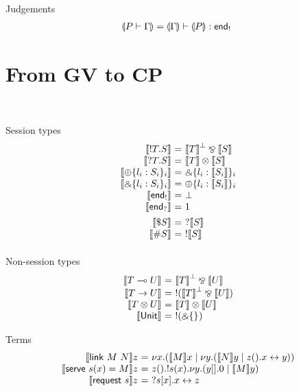\documentclass{easychair}
\makeatletter
\newcommand{\ba}{\begin{array}}
\newcommand{\ea}{\end{array}}
\newenvironment{equations}{\[\ba{@{}r@{~}c@{~}l@{}}}{\ea\]}
\newcommand{\key}{\mathsf}
\newcommand{\set}[1]{\{ #1 \}}
\newcommand{\gvtocp}[1]{\llbracket{#1}\rrbracket}
\newcommand{\cptogv}[1]{\llparenthesis{#1}\rrparenthesis}
\newcommand{\row}[2]{\set{#1}_{#2}}
\newcommand{\gvOutput}[2]{!{#1}.{#2}}
\newcommand{\gvInput}[2]{?{#1}.{#2}}
\newcommand{\gvEndOutput}{\key{end}_!}
\newcommand{\gvEndInput}{\key{end}_?}
\newcommand{\gvPlus}[2]{\oplus \row{#1}{#2}}
\newcommand{\gvChoice}[2]{\binampersand \row{#1}{#2}}
\newcommand{\gvServer}[1]{\${#1}}
\newcommand{\gvService}[1]{\#{#1}}
\newcommand{\cpj}[2]{{#1} \vdash {#2}}
\newcommand{\gvj}[3]{{#1} \vdash {#2} : {#3}}
\newcommand{\la}{l}
\newcommand{\PR}{P}
\newcommand{\G}{\Gamma}
\newcommand{\SE}{S}
\newcommand{\T}{T}
\newcommand{\U}{U}
\newcommand{\gvLinFun}[2]{{#1} \multimap {#2}}
\newcommand{\gvUnFun}[2]{{#1} \to {#2}}
\newcommand{\gvTimes}[2]{{#1} \otimes {#2}}
\newcommand{\gvUnitType}{\key{Unit}}
\newcommand{\gvLink}[2]{\key{link}~{#1}~{#2}}
\newcommand{\gvServe}[3]{\key{serve}~{#1}({#2})={#3}}
\newcommand{\gvRequest}[1]{\key{request}~{#1}}
\newcommand{\cpLink}[2]{{#1} \leftrightarrow {#2}}
\newcommand{\cpCut}[3]{\nu {#1}.({#2} \mid {#3})}
\newcommand{\cpServe}[3]{!{#1}({#2}).{#3}}
\newcommand{\cpRequest}[3]{?{#1}[{#2}].{#3}}
\newcommand{\cpEmptyOut}[1]{{#1}[].0}
\newcommand{\cpEmptyIn}[2]{{#1}().{#2}}
\newcommand{\cpTimes}[2]{{#1} \otimes {#2}}
\newcommand{\cpPar}[2]{{#1} \mathbin{\bindnasrepma} {#2}}
\newcommand{\cpPlus}[2]{\oplus \row{#1}{#2}}
\newcommand{\cpWith}[2]{\binampersand \row{#1}{#2}}
\newcommand{\cpOne}{1}
\newcommand{\cpBottom}{\bot}
\newcommand{\cpOfCourse}[1]{!{#1}}
\newcommand{\cpWhyNot}[1]{?{#1}}
\newcommand{\cpDual}[1]{{#1}^\bot}
\makeatother
\begin{document}
Judgements
\begin{equations}
\cptogv{\cpj{\PR}{\G}} = \gvj{\cptogv{\G}}{\cptogv{\PR}}{\gvEndOutput}
\end{equations}

\section{From GV to CP}
~

Session types
\begin{equations}
\gvtocp{\gvOutput{\T}{\SE}}        &=& \cpPar{\cpDual{\gvtocp{\T}}}{\gvtocp{\SE}} \\
\gvtocp{\gvInput{\T}{\SE}}         &=& \cpTimes{\gvtocp{\T}}{\gvtocp{\SE}} \\
\gvtocp{\gvPlus{\la_i:\SE_i}{i}}   &=& \cpWith{\la_i:\gvtocp{\SE_i}}{i} \\
\gvtocp{\gvChoice{\la_i:\SE_i}{i}} &=& \cpPlus{\la_i:\gvtocp{\SE_i}}{i} \\
\gvtocp{\gvEndOutput}              &=& \cpBottom \\
\gvtocp{\gvEndInput}               &=& \cpOne \\[1ex]

\gvtocp{\gvServer{\SE}}  &=& \cpWhyNot{\gvtocp{\SE}} \\
\gvtocp{\gvService{\SE}} &=& \cpOfCourse{\gvtocp{\SE}} \\[1ex]
\end{equations}

Non-session types
\begin{equations}
\gvtocp{\gvLinFun{\T}{\U}} &=& \cpPar{\cpDual{\gvtocp{\T}}}{\gvtocp{\U}} \\
\gvtocp{\gvUnFun{\T}{\U}} &=& \cpOfCourse{(\cpPar{\cpDual{\gvtocp{\T}}}{\gvtocp{\U}})} \\
\gvtocp{\gvTimes{\T}{\U}} &=& \cpTimes{\gvtocp{\T}}{\gvtocp{\U}} \\
\gvtocp{\gvUnitType} &=& \cpOfCourse{(\cpWith{}{})} \\
\end{equations}

Terms
\begin{equations}
\gvtocp{\gvLink{M}{N}}z &=& \cpCut{x}{\gvtocp{M}x}{\cpCut{y}{\gvtocp{N}y}{\cpEmptyIn{z}{\cpLink{x}{y}}}} \\
\gvtocp{\gvServe{s}{x}{M}}z &=&
  \cpEmptyIn{z}
            {\cpServe{s}{x}
                     {\cpCut{y}{\cpEmptyOut{y}}{\gvtocp{M}y}}} \\
\gvtocp{\gvRequest{s}}z &=& \cpRequest{s}{x}{\cpLink{x}{z}} \\
\end{equations}
\end{document}
